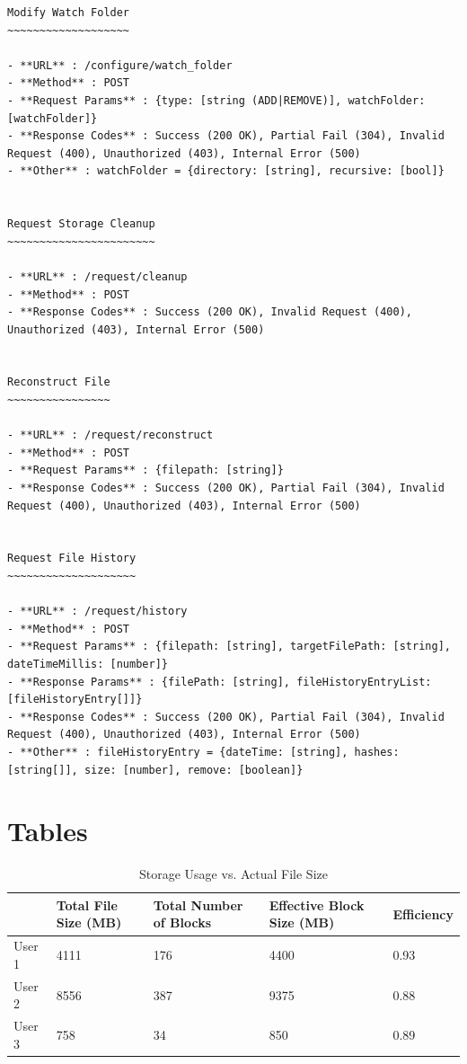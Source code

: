 \documentclass[11pt, a4paper, twocolumn, twoside]{report}
\begin{document}
\begin{lstlisting}[language=RsT, caption=Membrane API Documentation, label=lst:apiDocs]
Modify Watch Folder
~~~~~~~~~~~~~~~~~~~

- **URL** : /configure/watch_folder
- **Method** : POST
- **Request Params** : {type: [string (ADD|REMOVE)], watchFolder: [watchFolder]}
- **Response Codes** : Success (200 OK), Partial Fail (304), Invalid Request (400), Unauthorized (403), Internal Error (500)
- **Other** : watchFolder = {directory: [string], recursive: [bool]}


Request Storage Cleanup
~~~~~~~~~~~~~~~~~~~~~~~

- **URL** : /request/cleanup
- **Method** : POST
- **Response Codes** : Success (200 OK), Invalid Request (400), Unauthorized (403), Internal Error (500)


Reconstruct File
~~~~~~~~~~~~~~~~

- **URL** : /request/reconstruct
- **Method** : POST
- **Request Params** : {filepath: [string]}
- **Response Codes** : Success (200 OK), Partial Fail (304), Invalid Request (400), Unauthorized (403), Internal Error (500)


Request File History
~~~~~~~~~~~~~~~~~~~~

- **URL** : /request/history
- **Method** : POST
- **Request Params** : {filepath: [string], targetFilePath: [string], dateTimeMillis: [number]}
- **Response Params** : {filePath: [string], fileHistoryEntryList: [fileHistoryEntry[]]}
- **Response Codes** : Success (200 OK), Partial Fail (304), Invalid Request (400), Unauthorized (403), Internal Error (500)
- **Other** : fileHistoryEntry = {dateTime: [string], hashes: [string[]], size: [number], remove: [boolean]}
\end{lstlisting}

\section{Tables}

\begin{table}[h!]
\centering
\label{tab:storageUsage}
\begin{tabular}{|l|l|l|l|l|}
\hline
       & Total File Size (MB) & Total Number of Blocks & Effective Block Size (MB) & Efficiency \\ \hline
User 1 & 4111                 & 176                    & 4400                      & 0.93       \\ \hline
User 2 & 8556                 & 387                    & 9375                      & 0.88       \\ \hline
User 3 & 758                  & 34                     & 850                       & 0.89       \\ \hline
\end{tabular}
\caption{Storage Usage vs. Actual File Size}
\end{table}
\end{document}
